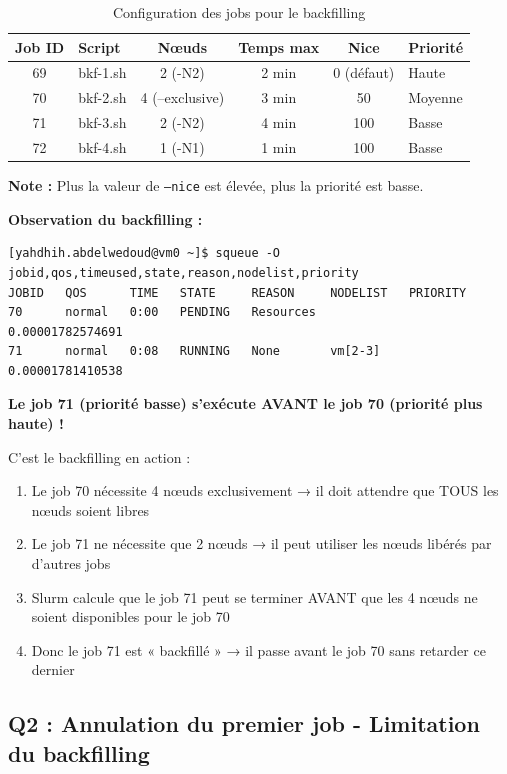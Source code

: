 \documentclass[12pt,a4paper]{article}
\newcommand{\code}[1]{\texttt{#1}}
\begin{document}
\begin{table}[h]
\centering
\begin{tabular}{|c|l|c|c|c|l|}
\hline
\textbf{Job ID} & \textbf{Script} & \textbf{Nœuds} & \textbf{Temps max} & \textbf{Nice} & \textbf{Priorité} \\
\hline
69 & bkf-1.sh & 2 (-N2) & 2 min & 0 (défaut) & Haute \\
70 & bkf-2.sh & 4 (--exclusive) & 3 min & 50 & Moyenne \\
71 & bkf-3.sh & 2 (-N2) & 4 min & 100 & Basse \\
72 & bkf-4.sh & 1 (-N1) & 1 min & 100 & Basse \\
\hline
\end{tabular}
\caption{Configuration des jobs pour le backfilling}
\end{table}

\textbf{Note :} Plus la valeur de \code{--nice} est élevée, plus la priorité est basse.

\textbf{Observation du backfilling :}
\begin{lstlisting}
[yahdhih.abdelwedoud@vm0 ~]$ squeue -O jobid,qos,timeused,state,reason,nodelist,priority
JOBID   QOS      TIME   STATE     REASON     NODELIST   PRIORITY            
70      normal   0:00   PENDING   Resources             0.00001782574691    
71      normal   0:08   RUNNING   None       vm[2-3]    0.00001781410538    
\end{lstlisting}

\textbf{Le job 71 (priorité basse) s'exécute AVANT le job 70 (priorité plus haute) !}

C'est le backfilling en action :
\begin{enumerate}
    \item Le job 70 nécessite 4 nœuds exclusivement → il doit attendre que TOUS les nœuds soient libres
    \item Le job 71 ne nécessite que 2 nœuds → il peut utiliser les nœuds libérés par d'autres jobs
    \item Slurm calcule que le job 71 peut se terminer AVANT que les 4 nœuds ne soient disponibles pour le job 70
    \item Donc le job 71 est « backfillé » → il passe avant le job 70 sans retarder ce dernier
\end{enumerate}

\subsection{Q2 : Annulation du premier job - Limitation du backfilling}
\end{document}
